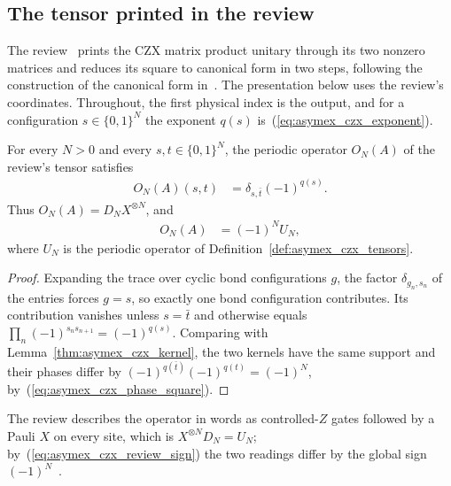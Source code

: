 \subsection{The tensor printed in the review}%
\label{sec:asymex_czx_review}

The review~\cite[Appendix~A, ``The CZX MPU'']{Cirac2021Matrix} prints the
CZX matrix product unitary through its two nonzero matrices and reduces its
square to canonical form in two steps, following the construction of the
canonical form in~\cite[Section~IV]{Cirac2021Matrix}. The presentation
below uses the review's coordinates. Throughout, the
first physical index is the output, and for a configuration
$s\in\{0,1\}^N$ the exponent $q(s)$ is~(\ref{eq:asymex_czx_exponent}).

\begin{lemma}
    \label{thm:asymex_czx_review_kernel}
    \leanok
    For every $N>0$ and every $s,t\in\{0,1\}^N$, the periodic operator
    $O_N(A)$ of the review's tensor satisfies
    \begin{align}
        O_N(A)(s,t) & =\delta_{s,\bar t}(-1)^{q(s)}.
        \label{eq:asymex_czx_review_kernel}
    \end{align}
    Thus $O_N(A)=D_NX^{\otimes N}$, and
    \begin{align}
        O_N(A) & =(-1)^NU_N,
        \label{eq:asymex_czx_review_sign}
    \end{align}
    where $U_N$ is the periodic operator of
    Definition~\ref{def:asymex_czx_tensors}.
\end{lemma}

\begin{proof}
    \leanok
    Expanding the trace over cyclic bond configurations $g$, the factor
    $\delta_{g_n,s_n}$ of the entries forces $g=s$, so exactly one bond
    configuration contributes. Its contribution vanishes unless $s=\bar t$
    and otherwise equals $\prod_n(-1)^{s_ns_{n+1}}=(-1)^{q(s)}$. Comparing
    with Lemma~\ref{thm:asymex_czx_kernel}, the two kernels have the same
    support and their phases differ by
    $(-1)^{q(\bar t)}(-1)^{q(t)}=(-1)^N$,
    by~(\ref{eq:asymex_czx_phase_square}).
\end{proof}

The review describes the operator in words as controlled-$Z$ gates
followed by a Pauli $X$ on every site, which is $X^{\otimes N}D_N=U_N$;
by~(\ref{eq:asymex_czx_review_sign}) the two readings differ by the global
sign $(-1)^N$~\cite{gap:mpu_czx_tensor_normalization}.

